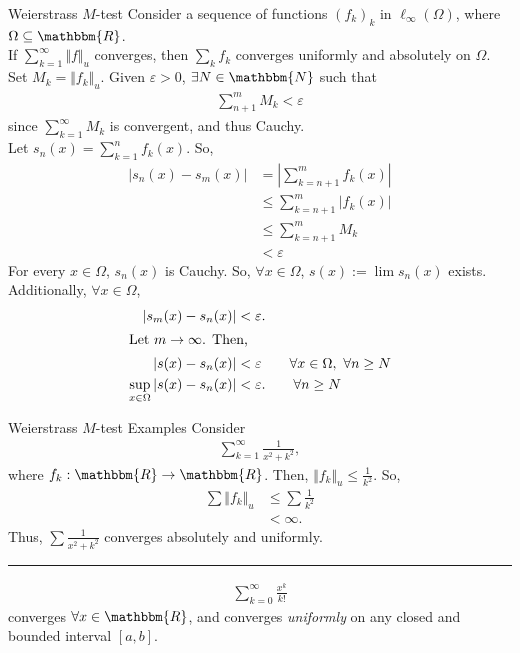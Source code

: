 \documentclass[10pt]{extarticle}
\newcommand{\N}{\mathbbm{N}}
\newcommand{\R}{\mathbbm{R}}
\begin{document}
  \begin{problem}{Weierstrass $M$-test}
    Consider a sequence of functions $(f_k)_k$ in $\ell_{\infty}(\Omega)$, where $\Omega \subseteq \R$.\\

    If $\sum_{k=1}^{\infty}\Vert f\Vert_u$ converges, then $\sum_{k} f_k$ converges uniformly and absolutely on $\Omega$.
    \tcblower
    Set $M_k = \Vert f_k \Vert_u$. Given $\varepsilon > 0$, $\exists N \in \N$ such that
    \begin{align*}
      \sum_{n+1}^{m} M_k < \varepsilon \tag*{$\forall m > n \geq N$}
    \end{align*}
    since $\sum_{k=1}^{\infty}M_k$ is convergent, and thus Cauchy.\\

    Let $s_n(x) = \sum_{k=1}^{n} f_k(x)$. So,
    \begin{align*}
      |s_n(x) - s_m(x)| &= \left|\sum_{k=n+1}^{m}f_k(x)\right|\\
                        &\leq \sum_{k=n+1}^{m}|f_k(x)|\\
                        &\leq \sum_{k=n+1}^{m}M_k \\
                        &< \varepsilon \tag*{whenever $m > n \geq N$}
    \end{align*}
    For every $x\in\Omega$, $s_n(x)$ is Cauchy. So, $\forall x\in\Omega$, $s(x) := \lim s_n(x)$ exists.\\

    Additionally, $\forall x\in\Omega$,
    \begin{align*}
      |s_m(x) - s_n(x)| &< \varepsilon. \\
      \shortintertext{Let $m\rightarrow\infty$. Then,}
      |s(x) - s_n(x)| &< \varepsilon \tag*{$\forall x\in\Omega,~\forall n\geq N$}\\
      \sup_{x\in\Omega}|s(x) - s_n(x)| &< \varepsilon. \tag*{$\forall n \geq N$}
    \end{align*}
  \end{problem}
  \begin{problem}{Weierstrass $M$-test Examples}
    Consider
    \begin{align*}
      \sum_{k=1}^{\infty}\frac{1}{x^2 + k^2},
    \end{align*}
    where $f_k: \R \rightarrow \R$. Then, $\Vert f_k \Vert_u \leq \frac{1}{k^2}$. So,
    \begin{align*}
      \sum \Vert f_k \Vert_u &\leq \sum \frac{1}{k^2}\\
                             &< \infty.
    \end{align*}
    Thus, $\sum \frac{1}{x^2 + k^2}$ converges absolutely and uniformly.\\
    \vspace{4pt}
    \rule{\textwidth}{0.4pt}
    \vspace{4pt}
    \begin{align*}
      \sum_{k=0}^{\infty}\frac{x^k}{k!}
    \end{align*}
    converges $\forall x\in\R$, and converges \textit{uniformly} on any closed and bounded interval $[a,b]$.
  \end{problem}
\end{document}
